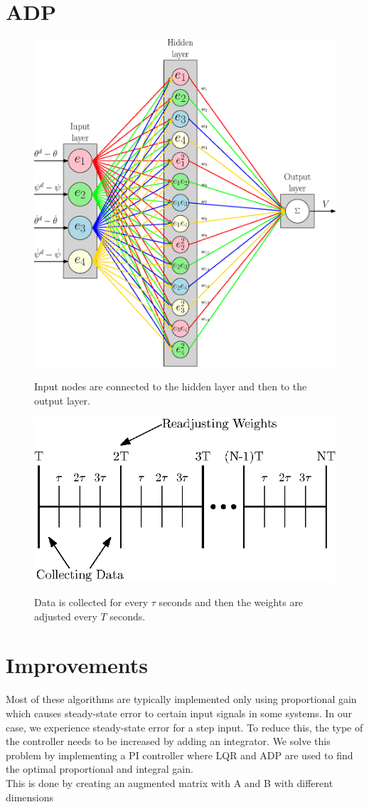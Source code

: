 \section{ADP}

\begin{figure}[!htbp]
    \centering
    \includegraphics[width=.46\textwidth,keepaspectratio=true]{figs/ipe/ADP_Neural_Network.eps}
    \label{fig:ADP_Neural_Network}
    \caption{Input nodes are connected to the hidden layer and then to the output layer.}
\end{figure}
\begin{figure}[!htbp]
    \centering
    \includegraphics[width=.46\textwidth,keepaspectratio=true]{figs/ipe/ADP_Samples.eps}
    \label{fig:ADP_Samples}
    \caption{Data is collected for every $\tau$ seconds and then the weights are adjusted every $T$ seconds.}
\end{figure}

\section{Improvements}
Most of these algorithms are typically implemented only using proportional gain which causes steady-state error to certain input signals in some systems.  In our case, we experience steady-state error for a step input.  To reduce this, the type of the controller needs to be increased by adding an integrator.  We solve this problem by implementing a PI controller where LQR and ADP are used to find the optimal proportional and integral gain.\\
This is done by creating an augmented matrix with A and B with different dimensions




